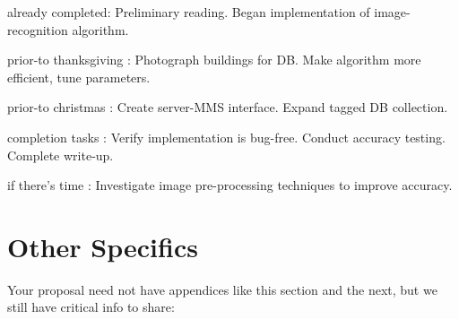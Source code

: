 \documentclass{sig-alternate}
\begin{document}
\begin{itemize*}
	\item {\sc already completed}: Preliminary reading. Began implementation of image-recognition algorithm.\vspace{3pt}
	\item {\sc prior-to thanksgiving} : Photograph buildings for DB. Make algorithm more efficient, tune parameters.\vspace{3pt}
	\item {\sc prior-to christmas} : Create server-MMS interface. Expand tagged DB collection.\vspace{3pt}
	\item {\sc completion tasks} : Verify implementation is bug-free. Conduct accuracy testing. Complete write-up.\vspace{3pt}
	\item {\sc if there's time} : Investigate image pre-processing techniques to improve accuracy.
\end{itemize*}


\vspace{150pt}

\appendix
\section{Other Specifics}
\label{app:other_specifics}
Your proposal need not have appendices like this section and the next, but we still have critical info to share:
\end{document}
